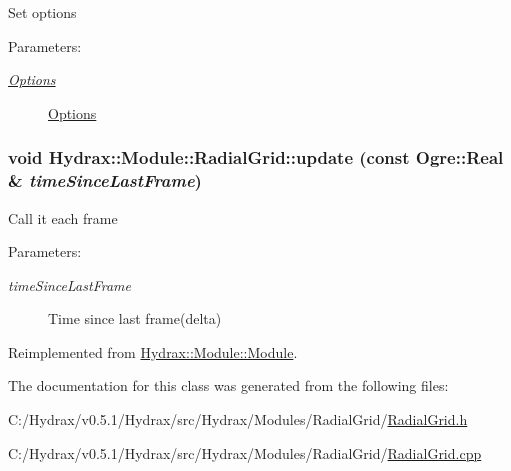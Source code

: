 Set options \begin{Desc}
\item[Parameters:]
\begin{description}
\item[{\em \hyperlink{struct_hydrax_1_1_module_1_1_radial_grid_1_1_options}{Options}}]\hyperlink{struct_hydrax_1_1_module_1_1_radial_grid_1_1_options}{Options} \end{description}
\end{Desc}
\hypertarget{class_hydrax_1_1_module_1_1_radial_grid_ee5199bfbee4429ab428d477e36443dd}{
\subsubsection[{update}]{\setlength{\rightskip}{0pt plus 5cm}void Hydrax::Module::RadialGrid::update (const Ogre::Real \& {\em timeSinceLastFrame})}}
\label{class_hydrax_1_1_module_1_1_radial_grid_ee5199bfbee4429ab428d477e36443dd}


Call it each frame \begin{Desc}
\item[Parameters:]
\begin{description}
\item[{\em timeSinceLastFrame}]Time since last frame(delta) \end{description}
\end{Desc}


Reimplemented from \hyperlink{class_hydrax_1_1_module_1_1_module_2042d450f99d9348fa4b7bd29ba89df3}{Hydrax::Module::Module}.

The documentation for this class was generated from the following files:\begin{CompactItemize}
\item 
C:/Hydrax/v0.5.1/Hydrax/src/Hydrax/Modules/RadialGrid/\hyperlink{_radial_grid_8h}{RadialGrid.h}\item 
C:/Hydrax/v0.5.1/Hydrax/src/Hydrax/Modules/RadialGrid/\hyperlink{_radial_grid_8cpp}{RadialGrid.cpp}\end{CompactItemize}
